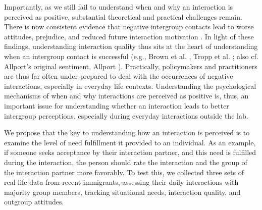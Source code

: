 \documentclass[man, 12pt, a4paper, mask]{apa7}
\theoremstyle{break}
\theoremstyle{plain}
\begin{document}
Importantly, as we still fail to understand when and why an interaction is perceived as positive, substantial theoretical and practical challenges remain. There is now consistent evidence that negative intergroup contacts lead to worse attitudes, prejudice, and reduced future interaction motivation \citep[e.g.,][]{Barlow2012, Prati2021, Graf2014}. In light of these findings, understanding interaction quality thus sits at the heart of understanding when an intergroup contact is successful (e.g., Brown et al. \citeyear{Brown2007}, Tropp et al. \citeyear{Tropp2016}; also cf. Allport’s original sentiment, Allport \citeyear{Allport1954b}). Practically, policymakers and practitioners are thus far often under-prepared to deal with the occurrences of negative interactions, especially in everyday life contexts. Understanding the psychological mechanisms of when and why interactions are perceived as positive is, thus, an important issue for understanding whether an interaction leads to better intergroup perceptions, especially during everyday interactions outside the lab.

We propose that the key to understanding how an interaction is perceived is to examine the level of need fulfillment it provided to an individual. As an example, if someone seeks acceptance by their interaction partner, and this need is fulfilled during the interaction, the person should rate the interaction and the group of the interaction partner more favorably. To test this, we collected three sets of real-life data from recent immigrants, assessing their daily interactions with majority group members, tracking situational needs, interaction quality, and outgroup attitudes. 
\end{document}
